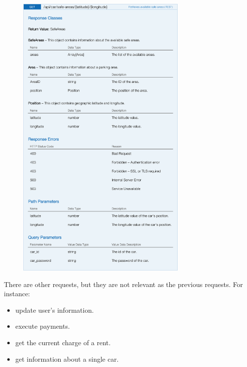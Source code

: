 \begin{figure}[H]
	\noindent
    	\centering
    	\includegraphics[height=550px, keepaspectratio]{apitables/APISafeAreas.png}
    	\label{fig:api-safe-areas}
\end{figure}


There are other requests, but they are not relevant as the previous requests. For instance:

\begin{itemize}
	\item update user's information.
	\item execute payments.
	\item get the current charge of a rent.
	\item get information about a single car.
\end{itemize}
